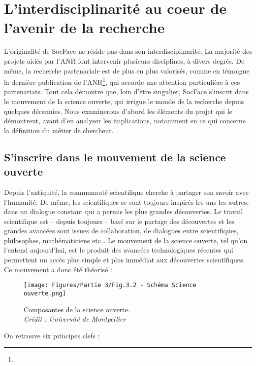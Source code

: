 \chapter{L'interdisciplinarité au coeur de l'avenir de la recherche}

L'originalité de SocFace ne réside pas dans son interdisciplinarité. La majorité des projets aidés par l’ANR font intervenir plusieurs disciplines, à divers degrés. De même, la recherche partenariale est de plus en plus valorisés, comme en témoigne la dernière publication de l'ANR\footnote{}, qui accorde une attention particulière à ces partenariats. Tout cela démontre que, loin d’être singulier, SocFace s’inscrit dans le mouvement de la science ouverte, qui irrigue le monde de la recherche depuis quelques décennies. Nous examinerons d'abord les éléments du projet qui le démontrent, avant d'en analyser les implications, notamment en ce qui concerne la définition du métier de chercheur.

    \section{S'inscrire dans le mouvement de la science ouverte}

Depuis l’antiquité, la communauté scientifique cherche à partager son savoir avec l’humanité. De même, les scientifiques se sont toujours inspirés les uns les autres, dans un dialogue constant qui a permis les plus grandes découvertes. Le travail scientifique est – depuis toujours – basé sur le partage des découvertes et les grandes avancées sont issues de collaboration, de dialogues entre scientifiques, philosophes, mathématiciens etc… Le mouvement de la science ouverte, tel qu’on l’entend aujourd’hui, est le produit des avancées technologiques récentes qui permettent un accès plus simple et plus immédiat aux découvertes scientifiques. Ce mouvement a donc été théorisé : 

\begin{figure}[H]
        \centering
        \texttt{[image: Figures/Partie 3/Fig.3.2 - Schéma Science ouverte.png]}
        \caption{Composantes de la science ouverte.\\
        \textit{Crédit : Université de Montpellier}}
        \label{fig:Fig3.2}
    \end{figure}

On retrouve six principes clefs : 

